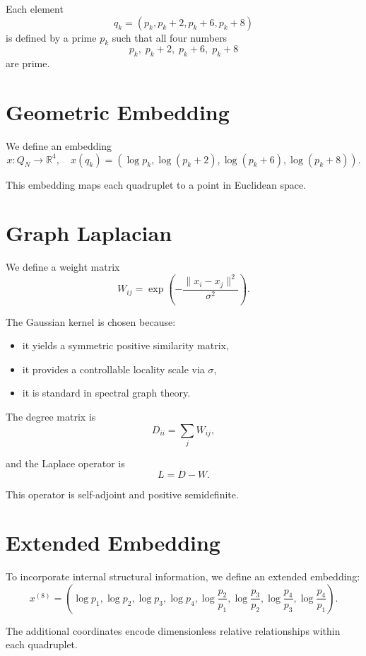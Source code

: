 \documentclass[11pt]{article}
\begin{document}
	Each element
	\[
	q_k = (p_k, p_k+2, p_k+6, p_k+8)
	\]
	is defined by a prime $p_k$ such that all four numbers
	\[
	p_k,\; p_k+2,\; p_k+6,\; p_k+8
	\]
	are prime.
	
	\section{Geometric Embedding}
	
	We define an embedding
	\[
	x : Q_N \to \mathbb{R}^4,
	\quad
	x(q_k) = (\log p_k, \log(p_k+2), \log(p_k+6), \log(p_k+8)).
	\]
	
	This embedding maps each quadruplet to a point in Euclidean space.
	
	\section{Graph Laplacian}
	
	We define a weight matrix
	\[
	W_{ij} = \exp\left(-\frac{\|x_i - x_j\|^2}{\sigma^2}\right).
	\]
	
	The Gaussian kernel is chosen because:
	\begin{itemize}
		\item it yields a symmetric positive similarity matrix,
		\item it provides a controllable locality scale via $\sigma$,
		\item it is standard in spectral graph theory.
	\end{itemize}
	
	The degree matrix is
	\[
	D_{ii} = \sum_j W_{ij},
	\]
	
	and the Laplace operator is
	\[
	L = D - W.
	\]
	
	This operator is self-adjoint and positive semidefinite.
	
	\section{Extended Embedding}
	
	To incorporate internal structural information, we define an extended embedding:
	\[
	x^{(8)} =
	(\log p_1,\log p_2,\log p_3,\log p_4,
	\log\frac{p_2}{p_1},\log\frac{p_3}{p_2},
	\log\frac{p_4}{p_3},\log\frac{p_4}{p_1}).
	\]
	
	The additional coordinates encode dimensionless relative relationships within each quadruplet.
	
\end{document}
